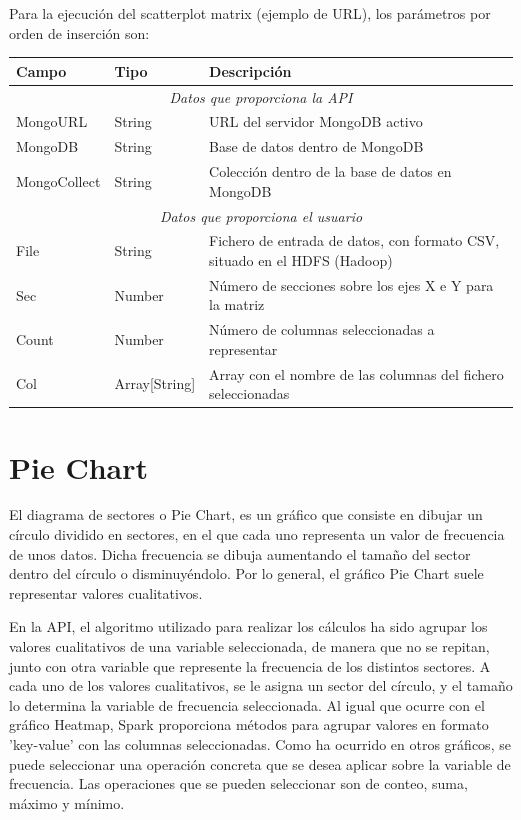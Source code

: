 Para la ejecución del scatterplot matrix (ejemplo de URL\footnotemark), los parámetros por orden de inserción son:

\begin{tabular}{|l|l|p{7cm}|}
	\hline 
	\textbf{Campo} & \textbf{Tipo} & \textbf{Descripción} \\ 
	\hline \hline
	\multicolumn{3}{|c|}{\textit{Datos que proporciona la API}} \\
	\hline 
	MongoURL & String & URL del servidor MongoDB activo \\ 
	\hline 
	MongoDB & String & Base de datos dentro de MongoDB \\ 
	\hline 
	MongoCollect& String & Colección dentro de la base de datos en MongoDB \\ 
	\hline \hline
	\multicolumn{3}{|c|}{\textit{Datos que proporciona el usuario}} \\
	\hline 
	File & String & Fichero de entrada de datos, con formato CSV, situado en el HDFS (Hadoop) \\ 
	\hline 
	Sec & Number & Número de secciones sobre los ejes X e Y para la matriz \\ 
	\hline 
	Count & Number & Número de columnas seleccionadas a representar \\ 
	\hline 
	Col & Array[String] & Array con el nombre de las columnas del fichero seleccionadas \\ 
	\hline  
\end{tabular} 


\section{Pie Chart}
El diagrama de sectores o Pie Chart, es un gráfico que consiste en dibujar un círculo dividido en sectores, en el que cada uno representa un valor de frecuencia de unos datos. Dicha frecuencia se dibuja aumentando el tamaño del sector dentro del círculo o disminuyéndolo. Por lo general, el gráfico Pie Chart suele representar valores cualitativos.

En la API, el algoritmo utilizado para realizar los cálculos ha sido agrupar los valores cualitativos de una variable seleccionada, de manera que no se repitan, junto con otra variable que represente la frecuencia de los distintos sectores. A cada uno de los valores cualitativos, se le asigna un sector del círculo, y el tamaño lo determina la variable de frecuencia seleccionada. Al igual que ocurre con el gráfico Heatmap, Spark proporciona métodos para agrupar valores en formato 'key-value' con las columnas seleccionadas. Como ha ocurrido en otros gráficos, se puede seleccionar una operación concreta que se desea aplicar sobre la variable de frecuencia. Las operaciones que se pueden seleccionar son de conteo, suma, máximo y mínimo.

